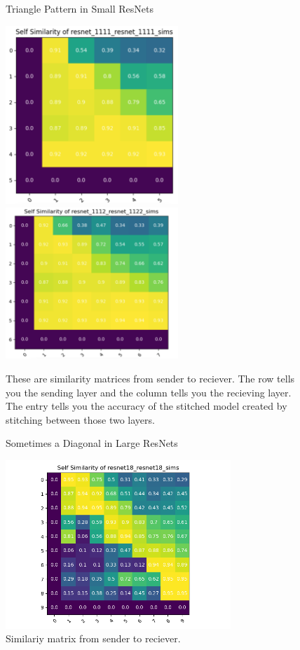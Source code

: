 \documentclass{article} %
\begin{document}
\begin{center}
   \begin{figure}[h!]
      \centering
      \caption{Triangle Pattern in Small ResNets}
      \includegraphics[width=6.5cm]{resnet1111_1111.png}
      \includegraphics[width=6.5cm]{resnet1112_1122.png}
      \caption*{These are similarity matrices from sender to reciever. The row tells you the sending layer and the column tells you the recieving layer.
      The entry tells you the accuracy of the stitched model created by stitching between those two layers.}
   \end{figure}
\end{center}

\begin{center}
   \begin{figure}[h!]
      \centering
      \caption{Sometimes a Diagonal in Large ResNets}
      \includegraphics[width=8.5cm]{resnet18_resnet18_sims.png}
      \caption*{Similariy matrix from sender to reciever.}
   \end{figure}
\end{center}
\end{document}
